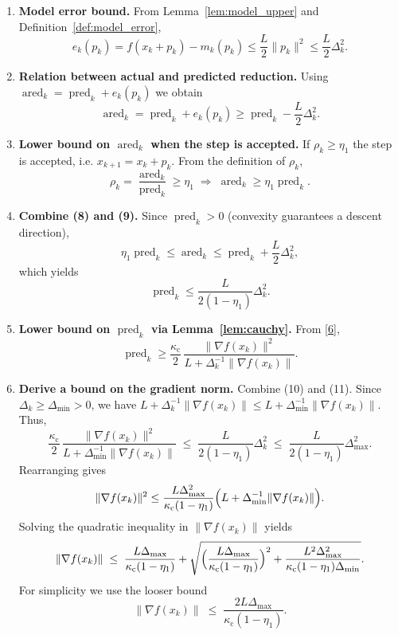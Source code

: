 \documentclass{article}
\begin{document}
\begin{enumerate}[label=[Step \arabic*]]
\item \textbf{Model error bound.}
From Lemma~\ref{lem:model_upper} and Definition~\ref{def:model_error},
\[
e_k(p_k)=f(x_k+p_k)-m_k(p_k)\le\frac{L}{2}\|p_k\|^{2}\le\frac{L}{2}\Delta_k^{2}.
\tag{7}
\]

\item \textbf{Relation between actual and predicted reduction.}
Using $ \operatorname{ared}_k = \operatorname{pred}_k + e_k(p_k)$ we obtain
\[
\operatorname{ared}_k
=\operatorname{pred}_k+e_k(p_k)
\ge\operatorname{pred}_k-\frac{L}{2}\Delta_k^{2}.
\tag{8}
\]

\item \textbf{Lower bound on $\operatorname{ared}_k$ when the step is accepted.}
If $\rho_k\ge\eta_{1}$ the step is accepted, i.e. $x_{k+1}=x_k+p_k$.
From the definition of $\rho_k$,
\[
\rho_k = \frac{\operatorname{ared}_k}{\operatorname{pred}_k}\ge\eta_{1}
\;\Longrightarrow\;
\operatorname{ared}_k\ge\eta_{1}\operatorname{pred}_k.
\tag{9}
\]

\item \textbf{Combine (8) and (9).}
Since $\operatorname{pred}_k>0$ (convexity guarantees a descent direction),
\[
\eta_{1}\operatorname{pred}_k\le\operatorname{ared}_k
\le\operatorname{pred}_k+\frac{L}{2}\Delta_k^{2},
\]
which yields
\[
\operatorname{pred}_k\le\frac{L}{2(1-\eta_{1})}\Delta_k^{2}.
\tag{10}
\]

\item \textbf{Lower bound on $\operatorname{pred}_k$ via Lemma~\ref{lem:cauchy}.}
From \eqref{6},
\[
\operatorname{pred}_k\ge
\frac{\kappa_{\mathrm{c}}}{2}\,
\frac{\|\nabla f(x_k)\|^{2}}{L+\Delta_k^{-1}\|\nabla f(x_k)\|}.
\tag{11}
\]

\item \textbf{Derive a bound on the gradient norm.}
Combine (10) and (11).  Since $\Delta_k\ge\Delta_{\min}>0$, we have
$L+\Delta_k^{-1}\|\nabla f(x_k)\|\le L+\Delta_{\min}^{-1}\|\nabla f(x_k)\|$.
Thus,
\[
\frac{\kappa_{\mathrm{c}}}{2}\,
\frac{\|\nabla f(x_k)\|^{2}}{L+\Delta_{\min}^{-1}\|\nabla f(x_k)\|}
\;\le\;
\frac{L}{2(1-\eta_{1})}\Delta_k^{2}
\;\le\;
\frac{L}{2(1-\eta_{1})}\Delta_{\max}^{2}.
\]
Rearranging gives
\[
\|\nabla f(x_k)\|^{2}\le
\frac{L\Delta_{\max}^{2}}{\kappa_{\mathrm{c}}(1-\eta_{1})}
\Bigl(L+\Delta_{\min}^{-1}\|\nabla f(x_k)\|\Bigr).
\]
Solving the quadratic inequality in $\|\nabla f(x_k)\|$ yields
\[
\|\nabla f(x_k)\|\;\le\;
\frac{L\Delta_{\max}}{\kappa_{\mathrm{c}}(1-\eta_{1})}
+ \sqrt{\Bigl(\frac{L\Delta_{\max}}{\kappa_{\mathrm{c}}(1-\eta_{1})}\Bigr)^{2}
+\frac{L^{2}\Delta_{\max}^{2}}{\kappa_{\mathrm{c}}(1-\eta_{1})\Delta_{\min}} }.
\]
For simplicity we use the looser bound
\[
\|\nabla f(x_k)\|\;\le\;
\frac{2L\Delta_{\max}}{\kappa_{\mathrm{c}}(1-\eta_{1})}.
\tag{12}
\]


\end{enumerate}
\end{document}
